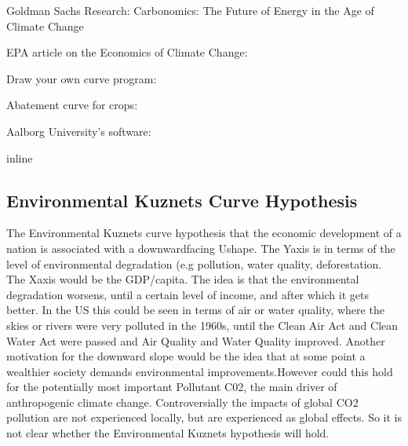 \documentclass[letterpaper,10pt,english]{jupyterBook}
\begin{document}
\sphinxAtStartPar
Goldman Sachs Research: Carbonomics: The Future of Energy in the Age of Climate Change

\sphinxAtStartPar
{}

\sphinxAtStartPar
EPA article on the Economics of Climate Change:

\sphinxAtStartPar
Draw your own curve program:

\sphinxAtStartPar
Abatement curve for crops:

\sphinxAtStartPar
Aalborg University’s software:

\begin{sphinxVerbatim}[commandchars=\\\{\}]
   
   
   
   
   
 inline
\end{sphinxVerbatim}


\subsection{Environmental Kuznets Curve Hypothesis}
\label{\detokenize{content/12-environmental/KuznetsHypothesis-Copy1:environmental-kuznets-curve-hypothesis}}\label{\detokenize{content/12-environmental/KuznetsHypothesis-Copy1::doc}}
\sphinxAtStartPar
The Environmental Kuznets curve hypothesis that the economic development of a nation is associated with a downward\sphinxhyphen{}facing U\sphinxhyphen{}shape.  The Y\sphinxhyphen{}axis is in terms of the level of environmental degradation (e.g pollution, water quality, deforestation.  The X\sphinxhyphen{}axis would be the GDP/capita.  The idea is that the environmental degradation worsens, until a certain level of income, and after which it gets better. In the US this could be seen in terms of air or water quality, where the skies or rivers were very polluted in the 1960s, until the Clean Air Act and Clean Water Act were passed and Air Quality and Water Quality improved.  Another motivation for the downward slope would be the idea that at some point a wealthier society demands environmental improvements.However \sphinxhyphen{} could this hold for the potentially most important Pollutant C02, the main driver of anthropogenic climate change.  Controversially the impacts of global CO2 pollution are not experienced locally, but are experienced as global effects. So it is not clear whether the Environmental Kuznets hypothesis will hold.
\end{document}
